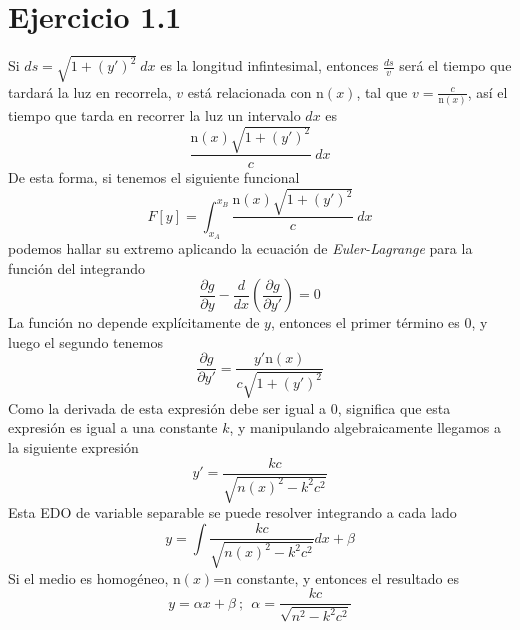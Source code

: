 \section{Ejercicio 1.1}


Si $ds=\sqrt{1+(y')^2} \ dx$ es la longitud infintesimal, entonces $\frac{ds}{v}$ será el tiempo que tardará la luz en recorrela, $v$ está relacionada con n$(x)$, tal que $v=\frac{c}{\mbox{n}(x)}$, así el tiempo que tarda en recorrer la luz un intervalo $dx$ es
\[ \frac{\mbox{n}(x) \sqrt{1+(y')^2}}{c} \ dx\]
De esta forma, si tenemos el siguiente funcional
\[ F[y] = \int_{x_A}^{x_B}{\frac{\mbox{n}(x) \sqrt{1+(y')^2}}{c} \ dx}\]
podemos hallar su extremo aplicando la ecuación de \textit{Euler-Lagrange} para la función del integrando
\[\frac{\partial g}{\partial y} - \frac{d}{dx}\left(\frac{\partial g}{\partial y'}\right)=0\]
La función no depende explícitamente de $y$, entonces el primer término es 0, y luego el segundo tenemos
\[\frac{\partial g}{\partial y'} = \frac{ y' \mbox{n}(x)}{c \sqrt{1+(y')^2}}\]
Como la derivada de esta expresión debe ser igual a 0, significa que esta expresión es igual a una constante $k$, y manipulando algebraicamente llegamos a la siguiente expresión
\[y' = \frac{kc}{\sqrt{n(x)^2-k^2 c^2}}\]
Esta EDO de variable separable se puede resolver integrando a cada lado
\[y = \int{\frac{kc}{\sqrt{n(x)^2-k^2 c^2}} dx} + \beta\]
Si el medio es homogéneo, n$(x)$=n constante, y entonces el resultado es 
\[y = \alpha x + \beta \ ; \ \ \alpha = \frac{kc}{\sqrt{n^2-k^2 c^2}}\]